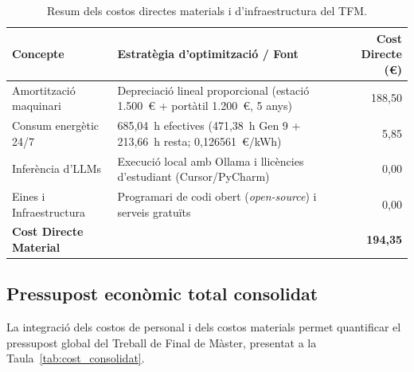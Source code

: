 \begin{table}[htbp]
    \centering
    \caption{Resum dels costos directes materials i d'infraestructura del TFM.}
    \label{tab:cost_economic}
    \small
    \begin{tabularx}{\textwidth}{lX r}
        \toprule
        \textbf{Concepte}           & \textbf{Estratègia d'optimització / Font}                            & \textbf{Cost Directe (€)} \\
        \midrule
        Amortització maquinari      & Depreciació lineal proporcional (estació 1.500~€ + portàtil 1.200~€, 5 anys) & 188,50                 \\
        Consum energètic 24/7       & 685,04~h efectives (471,38~h Gen 9 + 213,66~h resta; 0,126561~€/kWh) & 5,85                      \\
        Inferència d'LLMs           & Execució local amb Ollama i llicències d'estudiant (Cursor/PyCharm)  & 0,00                      \\
        Eines i Infraestructura     & Programari de codi obert (\emph{open-source}) i serveis gratuïts     & 0,00                      \\
        \midrule
        \textbf{Cost Directe Material} &                                                                   & \textbf{194,35}           \\
        \bottomrule
    \end{tabularx}
\end{table}

\subsection{Pressupost econòmic total consolidat}
\label{subsec:pressupost_consolidat}

La integració dels costos de personal i dels costos materials permet quantificar el pressupost global del Treball de Final de Màster, presentat a la Taula~\ref{tab:cost_consolidat}.

